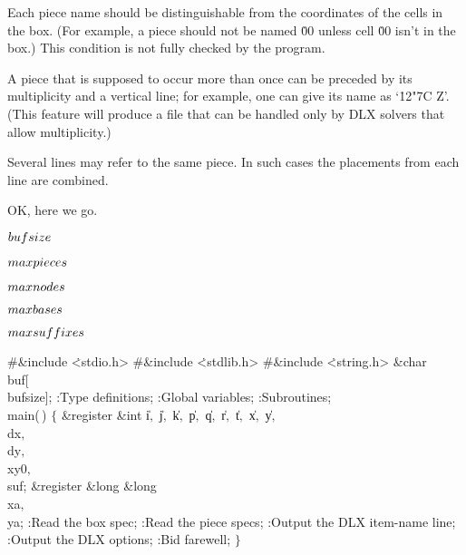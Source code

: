 Each piece name should be distinguishable from the coordinates of the cells
in the box. (For example, a piece should not be named \.{00} unless cell
\.{00} isn't in the box.) This condition is not fully checked by the program.

A piece that is supposed to occur more than once can be preceded by its
multiplicity and a vertical line; for example, one can give its name
as `\.{12\char"7C Z}'. (This feature will produce a file that can be handled
only by {\mc DLX} solvers that allow multiplicity.)

Several lines may refer to the same piece. In such cases the placements
from each line are combined.

\fi

OK, here we go.

\Y\B\4\D$\\{bufsize}$ \5
\par
\B\4\D$\\{maxpieces}$ \5
\par
\B\4\D$\\{maxnodes}$ \5
\par
\B\4\D$\\{maxbases}$ \5
\par
\B\4\D$\\{maxsuffixes}$ \5
\par
\Y\B\8\#\&{include} \.{<stdio.h>}\6
\8\#\&{include} \.{<stdlib.h>}\6
\8\#\&{include} \.{<string.h>}\6
\&{char} \\{buf}[\\{bufsize}];\7
:Type definitions\X;\6
:Global variables\X;\6
:Subroutines\X;\7
\\{main}(\,)\1\1\2\2\6
${}\{{}$\1\6
\&{register} \&{int} \|i${},{}$ \|j${},{}$ \|k${},{}$ \|p${},{}$ \|q${},{}$ %
\|r${},{}$ \|t${},{}$ \|x${},{}$ \|y${},{}$ \\{dx}${},{}$ \\{dy}${},{}$ %
\\{xy0}${},{}$ \\{suf};\6
\&{register} \&{long} \&{long} \\{xa}${},{}$ \\{ya};\7
:Read the box spec\X;\6
:Read the piece specs\X;\6
:Output the {\mc DLX} item-name line\X;\6
:Output the {\mc DLX} options\X;\6
:Bid farewell\X;\6
\4${}\}{}$\2\par
\fi

